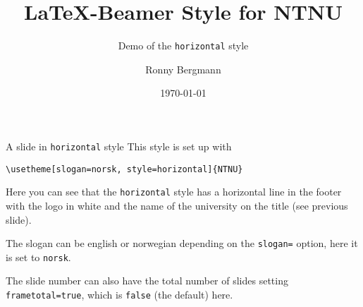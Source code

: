 \documentclass[aspectratio=169]{beamer}
\title{\LaTeX{}-Beamer Style for NTNU}
\subtitle{Demo of the  \texttt{horizontal} style}
\author{Ronny Bergmann}
\date{\today}
\begin{document}
	\maketitle
    \begin{frame}[fragile]{A slide in \texttt{horizontal} style}
        This style is set up with

        \lstinline!\usetheme[slogan=norsk, style=horizontal]{NTNU}!

        Here you can see that the \texttt{horizontal} style has a horizontal line in the footer with the logo in white and the name of the university on the title (see previous slide).

        The slogan can be english or norwegian depending on the \lstinline!slogan=! option, here it is set to \lstinline!norsk!.

        The slide number can also have the total number of slides setting \lstinline!frametotal=true!, which is \lstinline!false! (the default) here.
    \end{frame}
\end{document}
